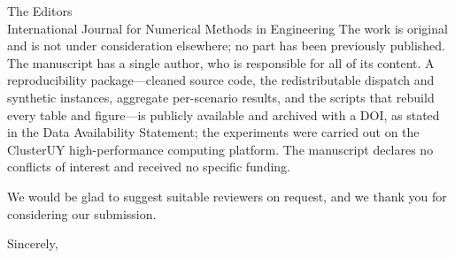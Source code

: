 \documentclass[11pt]{letter}
\begin{document}
\begin{letter}{The Editors\\International Journal for Numerical Methods in Engineering}
The work is original and is not under consideration elsewhere; no part has been previously
published. The manuscript has a single author, who is responsible for all of its content.
A reproducibility package---cleaned source code, the redistributable dispatch and synthetic
instances, aggregate per-scenario results, and the scripts that rebuild every table and
figure---is publicly available and archived with a DOI, as stated in the Data Availability
Statement; the experiments were carried out on the ClusterUY high-performance computing
platform. The manuscript declares no conflicts of interest and received no specific
funding.

We would be glad to suggest suitable reviewers on request, and we thank you for
considering our submission.

\closing{Sincerely,}

\end{letter}
\end{document}
